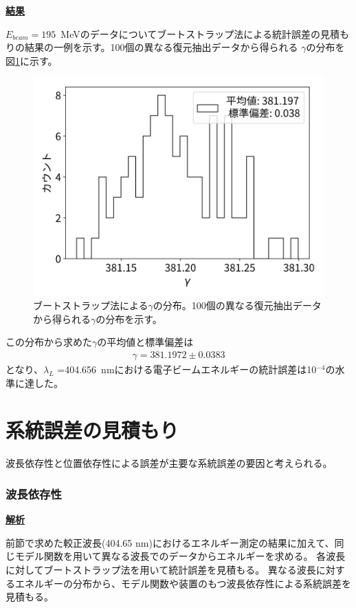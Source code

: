 \documentclass[a4paper,11pt,uplatex]{jsbook}
\begin{document}
\noindent \textbf{\underline{結果}}\par
$E_{beam} =195$~MeVのデータについてブートストラップ法による統計誤差の見積もりの結果の一例を示す。100個の異なる復元抽出データから得られる
$\gamma$の分布を図\ref{gamm_hist}に示す。
\begin{figure}[h]
  \centering
  \includegraphics[width=0.8\linewidth]{image/4-gammahist.png}
  \caption[ブートストラップ法による$\gamma$の分布]{ブートストラップ法による$\gamma$の分布。100個の異なる復元抽出データから得られる$\gamma$の分布を示す。} \label{gamm_hist}
\end{figure}
この分布から求めた$\gamma$の平均値と標準偏差は
\begin{eqnarray}
  \gamma = 381.1972 \pm 0.0383
\end{eqnarray}
となり、$\lambda_L$ =404.656~nmにおける電子ビームエネルギーの統計誤差は10$^{-4}$の水準に達した。
\section{系統誤差の見積もり}
波長依存性と位置依存性による誤差が主要な系統誤差の要因と考えられる。
\subsubsection{波長依存性}
\noindent \textbf{\underline{解析}}\par
前節で求めた較正波長(404.65 nm)におけるエネルギー測定の結果に加えて、同じモデル関数を用いて異なる波長でのデータからエネルギーを求める。
各波長に対してブートストラップ法を用いて統計誤差を見積もる。
異なる波長に対するエネルギーの分布から、モデル関数や装置のもつ波長依存性による系統誤差を見積もる。
\end{document}
